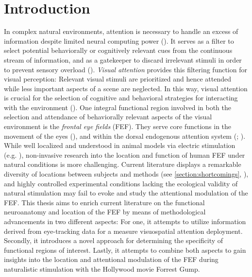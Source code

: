 \documentclass[a4paper, 12pt]{scrreprt}
\begin{document}
\chapter{Introduction}\label{section:intro}

In complex natural environments, attention is necessary to handle an excess of information despite limited neural computing power (\cite{carrasco2011visual}). It serves as a filter to select potential behaviorally or cognitively relevant cues from the continuous stream of information, and as a gatekeeper to discard irrelevant stimuli in order to prevent sensory overload (\cite{bellebaum2012neuropsych}). \textit{Visual attention} provides this filtering function for visual perception: Relevant visual stimuli are prioritized and hence attended while less important aspects of a scene are neglected. In this way, visual attention is crucial for the selection of cognitive and behavioral strategies for interacting with the environment (\cite{siegelbaum2000neuro}).\newline
One integral functional region involved in both the selection and attendance of behaviorally relevant aspects of the visual environment is the \textit{frontal eye fields} (FEF). They serve core functions in the movement of the eyes (\cite{krauzlis2014eye}), and within the dorsal endogenous attention system (\cite{corbetta2002control}; \cite{corbetta2008reorienting}). While well localized and understood in animal models via electric stimulation (e.g. \cite{bruce1985primate}), non-invasive research into the location and function of human FEF under natural conditions is more challenging. Current literature displays a remarkable diversity of locations between subjects and methods (see \ref{section:shortcomings}, \cite{vernet2014corrigendum}), and highly controlled experimental conditions lacking the ecological validity of natural stimulation may fail to evoke and study the attentional modulation of the FEF. \newline
This thesis aims to enrich current literature on the functional neuroanatomy and location of the FEF by means of methodological advancements in two different aspects: For one, it attempts to utilize information derived from eye-tracking data for a measure visuospatial attention deployment. Secondly, it introduces a novel approach for determining the specificity of functional regions of interest. Lastly, it attempts to combine both aspects to gain insights into the location and attentional modulation of the FEF during naturalistic stimulation with the Hollywood movie Forrest Gump. \newline
\end{document}
